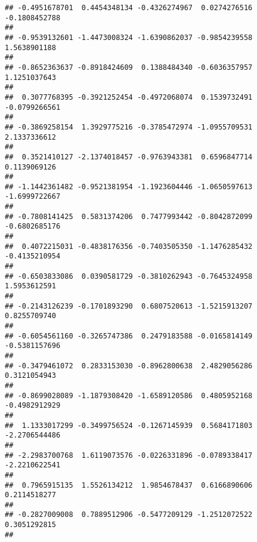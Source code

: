 \documentclass[]{article}
\begin{document}
\begin{verbatim}
## -0.4951678701  0.4454348134 -0.4326274967  0.0274276516 -0.1808452788 
##                                                                       
## -0.9539132601 -1.4473008324 -1.6390862037 -0.9854239558  1.5638901188 
##                                                                       
## -0.8652363637 -0.8918424609  0.1388484340 -0.6036357957  1.1251037643 
##                                                                       
##  0.3077768395 -0.3921252454 -0.4972068074  0.1539732491 -0.0799266561 
##                                                                       
## -0.3869258154  1.3929775216 -0.3785472974 -1.0955709531  2.1337336612 
##                                                                       
##  0.3521410127 -2.1374018457 -0.9763943381  0.6596847714  0.1139069126 
##                                                                       
## -1.1442361482 -0.9521381954 -1.1923604446 -1.0650597613 -1.6999722667 
##                                                                       
## -0.7808141425  0.5831374206  0.7477993442 -0.8042872099 -0.6802685176 
##                                                                       
##  0.4072215031 -0.4838176356 -0.7403505350 -1.1476285432 -0.4135210954 
##                                                                       
## -0.6503833086  0.0390581729 -0.3810262943 -0.7645324958  1.5953612591 
##                                                                       
## -0.2143126239 -0.1701893290  0.6807520613 -1.5215913207  0.8255709740 
##                                                                       
## -0.6054561160 -0.3265747386  0.2479183588 -0.0165814149 -0.5381157696 
##                                                                       
## -0.3479461072  0.2833153030 -0.8962800638  2.4829056286  0.3121054943 
##                                                                       
## -0.8699028089 -1.1879308420 -1.6589120586  0.4805952168 -0.4982912929 
##                                                                       
##  1.1333017299 -0.3499756524 -0.1267145939  0.5684171803 -2.2706544486 
##                                                                       
## -2.2983700768  1.6119073576 -0.0226331896 -0.0789338417 -2.2210622541 
##                                                                       
##  0.7965915135  1.5526134212  1.9854678437  0.6166890606  0.2114518277 
##                                                                       
## -0.2827009008  0.7889512906 -0.5477209129 -1.2512072522  0.3051292815 
##                                                                       

\end{verbatim}
\end{document}
